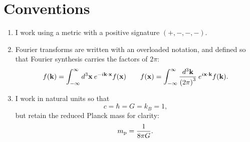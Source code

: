 \chapter*{Conventions}
\label{sec:cos:conventions}


\begin{enumerate}
  \item I work using a metric with a positive signature $(+,-,-,-)$.
  \item Fourier transforms are written with an overloaded notation, and defined so that Fourier synthesis carries the factors of $2\pi$:
    \begin{equation}
      f(\mathbf{k}) = \int_{-\infty}^{\infty} d^3\mathbf{x}\: e^{-i \mathbf{k}\cdot\mathbf{x}} f(\mathbf{x}) \qquad f(\mathbf{x}) = \int_{-\infty}^{\infty} \frac{d^3\mathbf{k}}{{(2\pi)}^3}\: e^{i \mathbf{x}\cdot\mathbf{k}} f(\mathbf{k}).
      \label{eqn:cos:fourier_transform}
    \end{equation}
  \item I work in natural units so that 
    \begin{equation}
      c = \hbar = G = k_B = 1,
      \label{eqn:cos:natural_units}
    \end{equation}
    but retain the reduced Planck mass for clarity:
    \begin{equation}
      m_{\mathrm{p}} = \frac{1}{8\pi G}.
      \label{eqn:cos:reduced_planck_mass}
    \end{equation}
    
\end{enumerate}

\cleardoublepage{}
